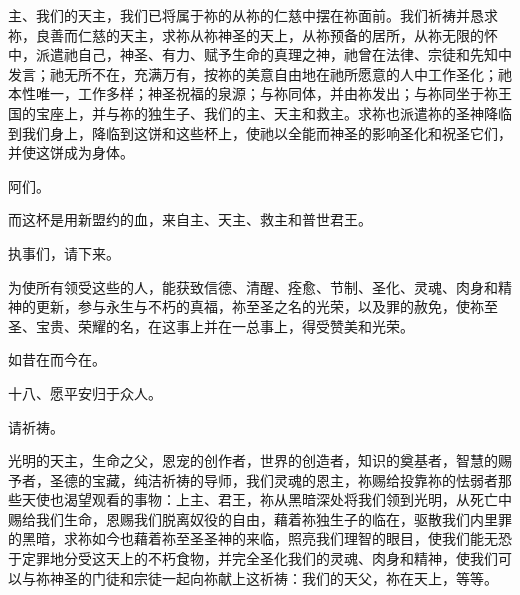 主、我们的天主，我们已将属于祢的从祢的仁慈中摆在祢面前。我们祈祷并恳求祢，良善而仁慈的天主，求祢从祢神圣的天上，从祢预备的居所，从祢无限的怀中，派遣祂自己，神圣、有力、赋予生命的真理之神，祂曾在法律、宗徒和先知中发言；祂无所不在，充满万有，按祢的美意自由地在祂所愿意的人中工作圣化；祂本性唯一，工作多样；神圣祝福的泉源；与祢同体，并由祢发出；与祢同坐于祢王国的宝座上，并与祢的独生子、我们的主、天主和救主。求祢也派遣祢的圣神降临到我们身上，降临到这饼和这些杯上，使祂以全能而神圣的影响圣化和祝圣它们，并使这饼成为身体。\par

\par

阿们。\par

\par

而这杯是用新盟约的血，来自主、天主、救主和普世君王。\par

\par

执事们，请下来。\par

\par

为使所有领受这些的人，能获致信德、清醒、痊愈、节制、圣化、灵魂、肉身和精神的更新，参与永生与不朽的真福，祢至圣之名的光荣，以及罪的赦免，使祢至圣、宝贵、荣耀的名，在这事上并在一总事上，得受赞美和光荣。\par

\par

如昔在而今在。\par

\par

十八、愿平安归于众人。\par

\par

请祈祷。\par

\par

光明的天主，生命之父，恩宠的创作者，世界的创造者，知识的奠基者，智慧的赐予者，圣德的宝藏，纯洁祈祷的导师，我们灵魂的恩主，祢赐给投靠祢的怯弱者那些天使也渴望观看的事物：上主、君王，祢从黑暗深处将我们领到光明，从死亡中赐给我们生命，恩赐我们脱离奴役的自由，藉着祢独生子的临在，驱散我们内里罪的黑暗，求祢如今也藉着祢至圣圣神的来临，照亮我们理智的眼目，使我们能无恐于定罪地分受这天上的不朽食物，并完全圣化我们的灵魂、肉身和精神，使我们可以与祢神圣的门徒和宗徒一起向祢献上这祈祷：我们的天父，祢在天上，等等。\par

